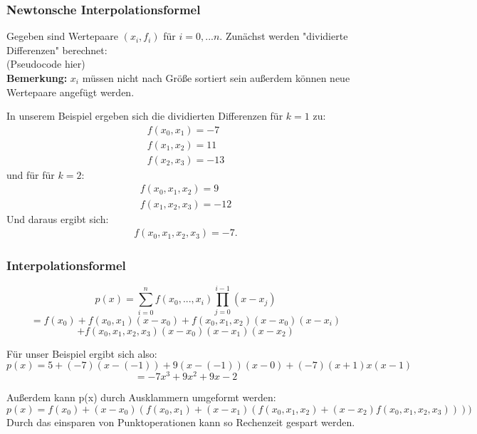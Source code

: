 \documentclass{scrartcl}
\begin{document}
\subsubsection*{Newtonsche Interpolationsformel}

Gegeben sind Wertepaare $(x_i,f_i)$ für $i=0,...n$.
Zunächst werden "dividierte Differenzen" berechnet:\\
(Pseudocode hier)\\
\textbf{Bemerkung:} $x_i$ müssen nicht nach Größe sortiert sein außerdem können neue Wertepaare angefügt werden.

In unserem Beispiel ergeben sich die dividierten Differenzen für $k=1$ zu:
\begin{align*}
f(x_0,x_1)=-7\\
f(x_1,x_2)=11\\
f(x_2,x_3)=-13
\end{align*}
und für für $k=2$:
\begin{align*}
f(x_0,x_1,x_2)=9 \\
f(x_1,x_2,x_3)= -12
\end{align*}
Und daraus ergibt sich:
\begin{align*}
f(x_0,x_1,x_2,x_3)=-7.
\end{align*}

\subsubsection*{Interpolationsformel}
\begin{equation*}
p(x)= \sum_{i=0}^n f(x_0,...,x_i) \prod_{j=0}^{i-1} (x-x_j)
\end{equation*}
\begin{equation*}
=f(x_0)+f(x_0,x_1)(x-x_0)+f(x_0,x_1,x_2)(x-x_0)(x-x_i)
\end{equation*}
\begin{equation*}
+f(x_0,x_1,x_2,x_3)(x-x_0)(x-x_1)(x-x_2)
\end{equation*}

Für unser Beispiel ergibt sich also:
\begin{equation*}
p(x)=5+(-7)(x-(-1))+9(x-(-1))(x-0)+(-7)(x+1) x (x-1)
\end{equation*}
\begin{equation*}
=-7x^3+9x^2+9x-2
\end{equation*}

Außerdem kann p(x) durch Ausklammern umgeformt werden:
\begin{equation*}
p(x)=f(x_0)+(x-x_0)(f(x_0,x_1)+(x-x_1)(f(x_0,x_1,x_2)+(x-x_2) f(x_0,x_1,x_2,x_3))))
\end{equation*}
Durch das einsparen von Punktoperationen kann so Rechenzeit gespart werden.
\end{document}
